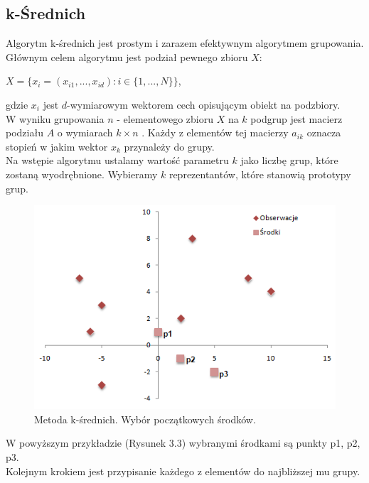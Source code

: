 \documentclass[12pt,a4paper]{report}
\begin{document}
\subsection{k-Średnich}%
Algorytm k-średnich jest prostym i zarazem efektywnym algorytmem grupowania.
\\Głównym celem algorytmu jest podział pewnego zbioru $X$:
\begin{center}
$X = \{x_i = (x_{i1},...,x_{id}) : i \in \{1,...,N\}\}$,
\end{center}
gdzie $x_i$ jest $d$-wymiarowym wektorem cech opisującym obiekt na podzbiory.
\\W wyniku grupowania $n$ - elementowego zbioru $X$ na $k$ podgrup jest macierz podziału $A$ o wymiarach $k\times n$ . Każdy z elementów tej macierzy $a_{ik}$ oznacza stopień w jakim wektor $x_k$ przynależy do grupy.
\\Na wstępie algorytmu ustalamy wartość parametru $k$ jako liczbę grup, które zostaną wyodrębnione. Wybieramy $k$ reprezentantów, które stanowią prototypy grup.
\begin{center}
\begin{figure}[H]
\centering
\includegraphics[scale=0.8]{ks_0.PNG} 
\caption{Metoda k-średnich. Wybór początkowych środków.}
\end{figure}
\end{center}
W powyższym przykładzie (Rysunek 3.3) wybranymi środkami są punkty p1, p2, p3.
\\
Kolejnym krokiem jest przypisanie każdego z elementów do najbliższej mu grupy.
\end{document}
